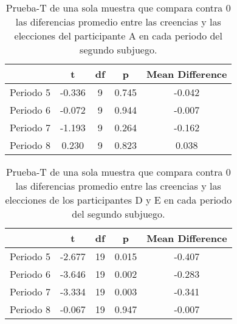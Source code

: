 \begin{table}
\caption[Diferencias Relativas en el Subjuego 2, Participante A]{Prueba-T de una sola muestra que compara contra 0 las diferencias promedio entre las creencias y las elecciones del participante A en cada periodo del segundo subjuego.}
\label{DN_Sub1}
\centering
\begin{tabular}{l | c c c c}  %
\toprule
\textbf{} & \textbf{t} & \textbf{df} & \textbf{p} & \textbf{Mean Difference}\\
\midrule
Periodo 5 & -0.336 & 9 & 0.745 & -0.042 \\
Periodo 6 & -0.072 & 9 & 0.944 & -0.007 \\
Periodo 7 & -1.193 & 9 & 0.264 & -0.162 \\
Periodo 8 & 0.230 & 9 & 0.823 & 0.038 \\
\bottomrule
\end{tabular}
\end{table}

\begin{table}
\caption[Diferencias Relativas en el Subjuego 2, Participantes D y E]{Prueba-T de una sola muestra que compara contra 0 las diferencias promedio entre las creencias y las elecciones de los participantes D y E en cada periodo del segundo subjuego.}
\label{DN_Sub1}
\centering
\begin{tabular}{l | c c c c}  %
\toprule
\textbf{} & \textbf{t} & \textbf{df} & \textbf{p} & \textbf{Mean Difference}\\
\midrule
Periodo 5 & -2.677 & 19 & 0.015 & -0.407 \\
Periodo 6 & -3.646 & 19 & 0.002 & -0.283 \\
Periodo 7 & -3.334 & 19 & 0.003 & -0.341 \\
Periodo 8 & -0.067 & 19 & 0.947 & -0.007 \\
\bottomrule
\end{tabular}
\end{table}

